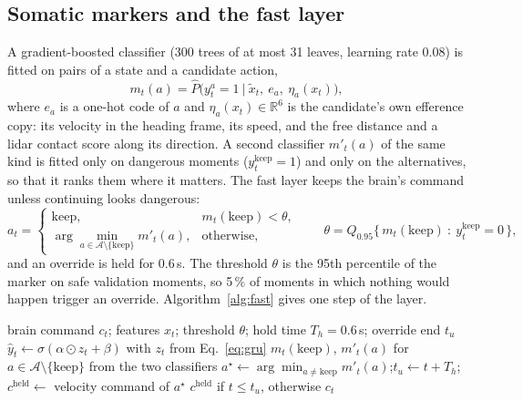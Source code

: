 \documentclass[10pt]{article}
\begin{document}
\subsection{Somatic markers and the fast layer}
A gradient-boosted classifier \citep{pedregosa2011} (300 trees of at most 31 leaves, learning rate 0.08) is fitted on pairs of a
state and a candidate action,
\begin{equation}
m_t(a)=\hat P\big(y^{a}_t=1\ \big|\ \tilde x_t,\ e_a,\ \eta_a(x_t)\big),
\end{equation}
where $e_a$ is a one-hot code of $a$ and $\eta_a(x_t)\in\mathbb{R}^6$ is the candidate's own efference copy: its velocity in the
heading frame, its speed, and the free distance and a lidar contact score along its direction. A second classifier $m'_t(a)$ of the
same kind is fitted only on dangerous moments ($y^{\mathrm{keep}}_t=1$) and only on the alternatives, so that it ranks them where
it matters. The fast layer keeps the brain's command unless continuing looks dangerous:
\begin{equation}
a_t=\begin{cases}\text{keep}, & m_t(\text{keep})<\theta,\\[2pt]
\arg\min_{a\in\mathcal A\setminus\{\text{keep}\}} m'_t(a), & \text{otherwise},\end{cases}
\qquad \theta=Q_{0.95}\big\{\,m_t(\text{keep})\ :\ y^{\mathrm{keep}}_t=0\,\big\},
\end{equation}
and an override is held for 0.6\,s. The threshold $\theta$ is the 95th percentile of the marker on safe validation moments, so
5\,\% of moments in which nothing would happen trigger an override. Algorithm~\ref{alg:fast} gives one step of the layer.

\begin{algorithm}[t]
\caption{One step of the fast layer (every 0.1\,s).}\label{alg:fast}
\begin{algorithmic}[1]
\Require brain command $c_t$; features $x_t$; threshold $\theta$; hold time $T_h=0.6$\,s; override end $t_u$
\State $\hat y_t\gets\sigma(\alpha\odot z_t+\beta)$ with $z_t$ from Eq.~\eqref{eq:gru} 
\State $m_t(\text{keep})$, $m'_t(a)$ for $a\in\mathcal A\setminus\{\text{keep}\}$ from the two classifiers
  \State $a^\star\gets\arg\min_{a\ne\text{keep}} m'_t(a)$;\quad $t_u\gets t+T_h$;\quad $c^{\mathrm{held}}\gets$ velocity command of $a^\star$
\EndIf
\State \Return $c^{\mathrm{held}}$ if $t\le t_u$, otherwise $c_t$
\end{algorithmic}
\end{algorithm}
\end{document}
